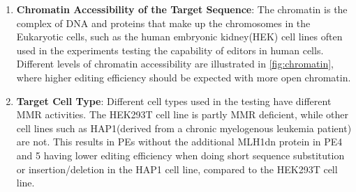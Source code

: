 \documentclass[12pt]{article}
\begin{document}
\begin{enumerate}
    \item \textbf{Chromatin Accessibility of the Target Sequence}: The chromatin is the complex of DNA and proteins that make up the chromosomes in the Eukaryotic cells, such as the human embryonic kidney(HEK) cell lines often used in the experiments testing the capability of editors in human cells\cite{thomasHEK293CellLine2005}. Different levels of chromatin accessibility  are illustrated in \autoref{fig:chromatin}, where higher editing efficiency should be expected with more open chromatin\cite{mathisPredictingPrimeEditing2023}. 

    \item \textbf{Target Cell Type}: Different cell types used in the testing have different MMR activities. The HEK293T cell line is partly MMR deficient, while other cell lines such as HAP1(derived from a chronic myelogenous leukemia patient) are not. This results in PEs without the additional MLH1dn protein in PE4 and 5 having lower editing efficiency when doing short sequence substitution or insertion/deletion in the HAP1 cell line, compared to the HEK293T cell line\cite{koeppelPredictionPrimeEditing2023}.
\end{enumerate}
\end{document}
